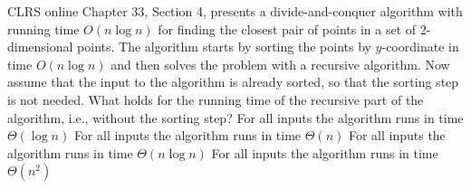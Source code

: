 CLRS online Chapter 33, Section 4, presents a divide-and-conquer algorithm with running time $O(n \log n)$ for finding the closest pair of points in a set of 2-dimensional points.
The algorithm starts by sorting the points by $y$-coordinate in time $O(n \log n)$ and then solves the problem with a recursive algorithm.
Now assume that the input to the algorithm is already sorted, so that the sorting step is not needed.
What holds for the running time of the recursive part of the algorithm, i.e., without the sorting step?
\oneanswer
\optionsstart
\answer For all inputs the algorithm runs in time $\Theta(\log n)$
\answer For all inputs the algorithm runs in time $\Theta(n)$
\answer For all inputs the algorithm runs in time $\Theta(n \log n)$ \correct
\answer For all inputs the algorithm runs in time $\Theta(n^2)$
\optionsend
{}



